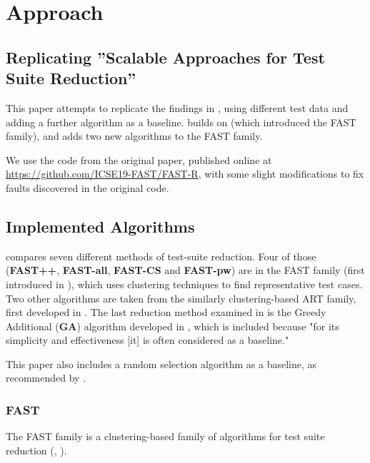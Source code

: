 
\chapter{Approach}\label{chapter:approach}

\section{Replicating ''Scalable Approaches for Test Suite Reduction''}

This paper attempts to replicate the findings in
\cite{cruciani2019scalable}, using different test data and adding a
further algorithm as a baseline. \cite{cruciani2019scalable} builds on
\cite{miranda2018fast} (which introduced the FAST family), and adds two
new algorithms to the FAST family.

We use the code from the original paper, published online at
\url{https://github.com/ICSE19-FAST/FAST-R}, with some slight
modifications to fix faults discovered in the original code.

\section{Implemented Algorithms}

\cite{cruciani2019scalable} compares seven different methods of
test-suite reduction. Four of those (\textbf{FAST++}, \textbf{FAST-all},
\textbf{FAST-CS} and \textbf{FAST-pw}) are in the FAST family
(first introduced in \cite{miranda2018fast}), which uses clustering
techniques to find representative test cases. Two other algorithms are
taken from the similarly clustering-based ART family, first developed
in \cite{chen2010adaptive}. The last reduction method examined in
\cite{cruciani2019scalable} is the Greedy Additional (\textbf{GA})
algorithm developed in \cite{rothermel2001prioritizing}, which is included
because "for its simplicity and effectiveness [it] is often considered
as a baseline."

This paper also includes a random selection algorithm as a baseline,
as recommended by \cite{khan2018systematic}.

\subsection{FAST}

The FAST family is a clustering-based family of algorithms for test
suite reduction (\cite{miranda2018fast}, \cite{cruciani2019scalable}).

